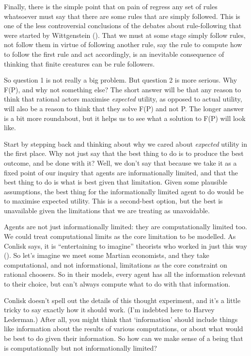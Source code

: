 \documentclass[
  10pt,
  letterpaper,
  twoside]{scrbook}
\begin{document}
Finally, there is the simple point that on pain of regress any set of
rules whatsoever must say that there are some rules that are simply
followed. This is one of the less controversial conclusions of the
debates about rule-following that were started by Wittgenstein
(). That we must at some stage
simply follow rules, not follow them in virtue of following another
rule, say the rule to compute how to follow the first rule and act
accordingly, is an inevitable consequence of thinking that finite
creatures can be rule followers.

So question 1 is not really a big problem. But question 2 is more
serious. Why F(P), and why not something else? The short answer will be
that any reason to think that rational actors maximise \emph{expected}
utility, as opposed to actual utility, will also be a reason to think
that they solve F(P) and not P. The longer answer is a bit more
roundabout, but it helps us to see what a solution to F(P) will look
like.

Start by stepping back and thinking about why we cared about
\emph{expected} utility in the first place. Why not just say that the
best thing to do is to produce the best outcome, and be done with it?
Well, we don't say that because we take it as a fixed point of our
inquiry that agents are informationally limited, and that the best thing
to do is what is best given that limitation. Given some plausible
assumptions, the best thing for the informationally limited agent to do
would be to maximise expected utility. This is a second-best option, but
the best is unavailable given the limitations that we are treating as
unavoidable.

Agents are not just informationally limited: they are computationally
limited too. We could treat computational limits as the core limitation
to be modelled. As Conlisk says, it is ``entertaining to imagine''
theorists who worked in just this way
(). So let's imagine we
meet some Martian economists, and they take computational, and not
informational, limitations as the core constraint on rational choosers.
So in their models, every agent has all the information relevant to
their choice, but can't always compute what to do with that information.

Conlisk doesn't spell out the details of this thought experiment, and
it's a little tricky to say exactly how it should work. (I'm indebted
here to Harvey Lederman.) After all, you might think that `information'
should include things like information about the results of various
computations, or about what would be best to do given their information.
So how can we make sense of a being that is computationally but not
informationally limited?
\end{document}
